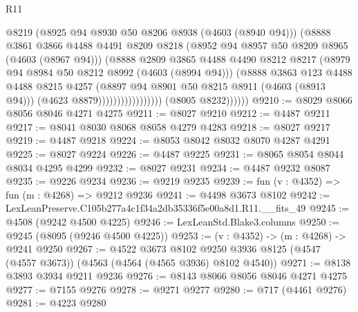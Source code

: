 \begin{lexlean}{R11}
\begin{coremodule}
                                        @8219
                                        (@8925 @94 @8930 @50 @8206 @8938 (@4603 (@8940 @94)))
                                        (@8888
                                          @3861
                                          @3866
                                          @4488
                                          @4491
                                          @8209
                                          @8218
                                          (@8952 @94 @8957 @50 @8209 @8965 (@4603 (@8967 @94)))
                                          (@8888
                                            @2809
                                            @3865
                                            @4488
                                            @4490
                                            @8212
                                            @8217
                                            (@8979 @94 @8984 @50 @8212 @8992 (@4603 (@8994 @94)))
                                            (@8888
                                              @3863
                                              @123
                                              @4488
                                              @4488
                                              @8215
                                              @4257
                                              (@8897 @94 @8901 @50 @8215 @8911 (@4603 (@8913 @94)))
                                              (@4623 @8879)))))))))))))))))
              (@8005 @8232))))))
@9210 := @8029 @8066 @8056 @8046 @4271 @4275
@9211 := @8027 @9210
@9212 := @4487 @9211
@9217 := @8041 @8030 @8068 @8058 @4279 @4283
@9218 := @8027 @9217
@9219 := @4487 @9218
@9224 := @8053 @8042 @8032 @8070 @4287 @4291
@9225 := @8027 @9224
@9226 := @4487 @9225
@9231 := @8065 @8054 @8044 @8034 @4295 @4299
@9232 := @8027 @9231
@9234 := @4487 @9232 @8087
@9235 := @9226 @9234
@9236 := @9219 @9235
@9239 := fun (v : @4352) => fun (m : @4268) => @9212 @9236
@9241 := @4498 @3673 @8102
@9242 := LexLeanPreserve.C105b277a4c1f34a2db35336f5e00a8d1.R11.__fits_49
@9245 := @4508 (@9242 @4500 @4225)
@9246 := LexLeanStd.Blake3.columns
@9250 := @9245 (@8095 (@9246 @4500 @4225))
@9253 := (v : @4352) -> (m : @4268) -> @9241 @9250
@9267 := @4522
    @3673
    @8102
    @9250
    @3936
    @8125
    (@4547 (@4557 @3673))
    (@4563 (@4564 (@4565 @3936) @8102 @4540))
@9271 := @8138 @3893 @3934 @9211 @9236
@9276 := @8143 @8066 @8056 @8046 @4271 @4275
@9277 := @7155 @9276
@9278 := @9271 @9277
@9280 := @717 (@4461 @9276)
@9281 := @4223 @9280

\end{coremodule}
\end{lexlean}
